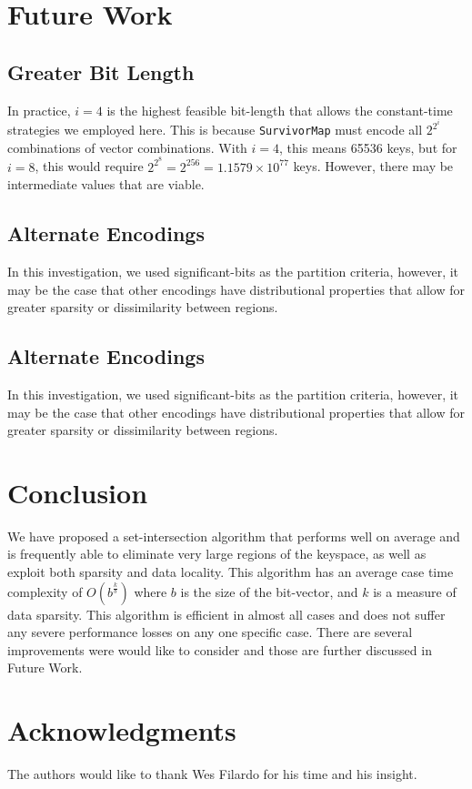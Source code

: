 \documentclass[11pt,letterpaper]{article}
\begin{document}
\section{Future Work}
\subsection{Greater Bit Length}
In practice, $i=4$ is the highest feasible bit-length that allows the constant-time
strategies we employed here.  This is because {\tt SurvivorMap} must encode
all $2^{2^i}$ combinations of vector combinations.  With $i=4$, this means
65536 keys, but for $i=8$, this would require $2^{2^8}=2^{256}=1.1579\times10^{77}$
keys.  However, there may be intermediate values that are viable.

\subsection{Alternate Encodings}
In this investigation, we used significant-bits as the partition criteria,
however, it may be the case that other encodings have distributional properties
that allow for greater sparsity or dissimilarity between regions.

\subsection{Alternate Encodings}
In this investigation, we used significant-bits as the partition criteria,
however, it may be the case that other encodings have distributional properties
that allow for greater sparsity or dissimilarity between regions.


\section{Conclusion}
We have proposed a set-intersection algorithm that performs well
on average and is frequently able to eliminate very large regions of
the keyspace, as well as exploit both sparsity and data locality.  
This algorithm has an average case time complexity of
$O\left(b^{\frac{k}{b}}\right)$ where $b$ is the size of the bit-vector,
and $k$ is a measure of data sparsity. This algorithm is efficient in almost
all cases and does not suffer any severe performance losses on any one
specific case. There are several improvements were would like to consider
and those are further discussed in Future Work.

\section*{Acknowledgments}
The authors would like to thank Wes Filardo for his time and his insight.



\end{document}
